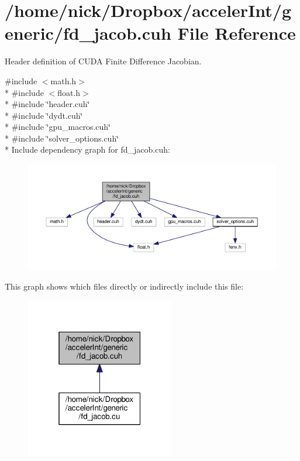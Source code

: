 \hypertarget{fd__jacob_8cuh}{}\section{/home/nick/\+Dropbox/acceler\+Int/generic/fd\+\_\+jacob.cuh File Reference}
\label{fd__jacob_8cuh}


Header definition of C\+U\+DA Finite Difference Jacobian.  


{\ttfamily \#include $<$math.\+h$>$}\\*
{\ttfamily \#include $<$float.\+h$>$}\\*
{\ttfamily \#include \char`\"{}header.\+cuh\char`\"{}}\\*
{\ttfamily \#include \char`\"{}dydt.\+cuh\char`\"{}}\\*
{\ttfamily \#include \char`\"{}gpu\+\_\+macros.\+cuh\char`\"{}}\\*
{\ttfamily \#include \char`\"{}solver\+\_\+options.\+cuh\char`\"{}}\\*
Include dependency graph for fd\+\_\+jacob.\+cuh\+:
\nopagebreak
\begin{figure}[H]
\begin{center}
\leavevmode
\includegraphics[width=350pt]{fd__jacob_8cuh__incl}
\end{center}
\end{figure}
This graph shows which files directly or indirectly include this file\+:
\nopagebreak
\begin{figure}[H]
\begin{center}
\leavevmode
\includegraphics[width=184pt]{fd__jacob_8cuh__dep__incl}
\end{center}
\end{figure}
